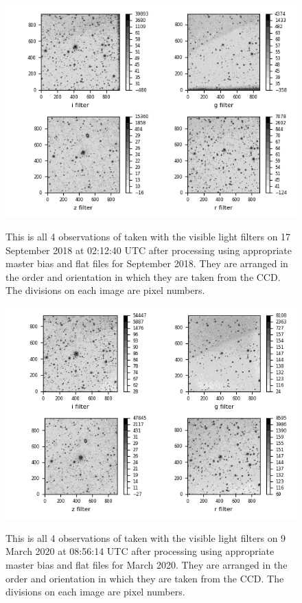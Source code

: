 \begin{figure}[!htbp]
\begin{center}
\includegraphics[scale=1]{images/init4example.png}
\end{center}
\caption{This is all 4 observations of {\prox} taken with the visible light
filters on 17 September 2018 at 02:12:40 UTC after processing using
appropriate master bias and flat files for September 2018. They are arranged in
the order and orientation in which they are taken from the CCD. The
divisions on each image are pixel numbers.}
\protect\label{fig:init4example}
\end{figure}

\begin{figure}[!htbp]
\begin{center}
\includegraphics[scale=1]{images/init4example20.png}
\end{center}
\caption{This is all 4 observations of {\prox} taken with the visible light
filters on 9 March 2020 at 08:56:14 UTC after processing using
appropriate master bias and flat files for March 2020. They are arranged in
the order and orientation in which they are taken from the CCD. The
divisions on each image are pixel numbers.}
\protect\label{fig:init4example20}
\end{figure}

